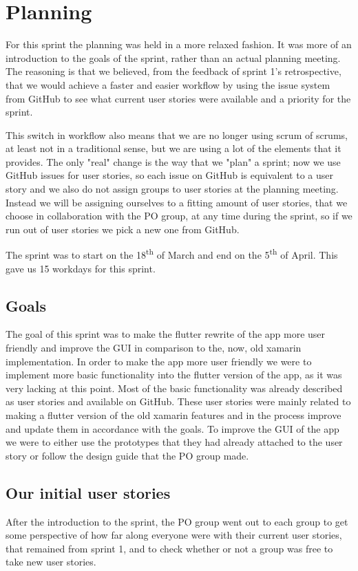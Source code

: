\section{Planning}
For this sprint the planning was held in a more relaxed fashion.
It was more of an introduction to the goals of the sprint, rather than an actual planning meeting.
The reasoning is that we believed, from the feedback of sprint 1's retrospective, that we would achieve a faster and easier workflow by using the issue system from GitHub to see what current user stories were available and a priority for the sprint. 

This switch in workflow also means that we are no longer using scrum of scrums, at least not in a traditional sense, but we are using a lot of the elements that it provides.
The only "real" change is the way that we "plan" a sprint; now we use GitHub issues for user stories, so each issue on GitHub is equivalent to a user story and we also do not assign groups to user stories at the planning meeting. 
Instead we will be assigning ourselves to a fitting amount of user stories, that we choose in collaboration with the PO group, at any time during the sprint, so if we run out of user stories we pick a new one from GitHub. 

The sprint was to start on the 18\textsuperscript{th} of March and end on the 5\textsuperscript{th} of April. This gave us 15 workdays for this sprint.

\subsection{Goals}
The goal of this sprint was to make the flutter rewrite of the app more user friendly and improve the GUI in comparison to the, now, old xamarin implementation.
In order to make the app more user friendly we were to implement more basic functionality into the flutter version of the app, as it was very lacking at this point.
Most of the basic functionality was already described as user stories and available on GitHub. 
These user stories were mainly related to making a flutter version of the old xamarin features and in the process improve and update them in accordance with the goals.
To improve the GUI of the app we were to either use the prototypes that they had already attached to the user story or follow the design guide that the PO group made.

\subsection{Our initial user stories}
After the introduction to the sprint, the PO group went out to each group to get some perspective of how far along everyone were with their current user stories, that remained from sprint 1, and to check whether or not a group was free to take new user stories.

